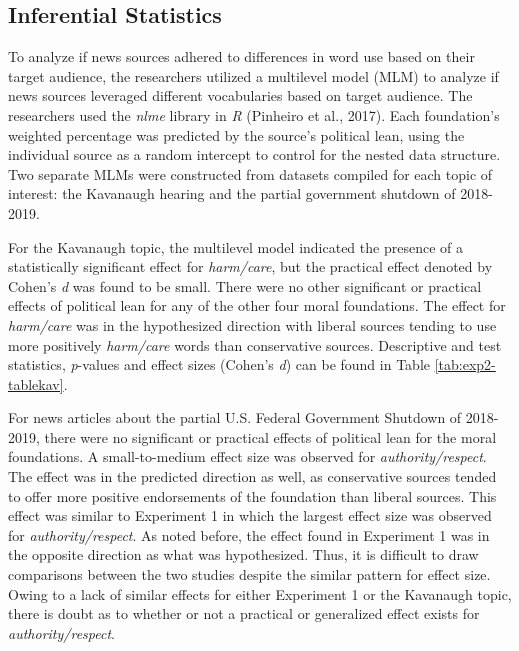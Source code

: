 \documentclass[english,,man]{apa6}
\begin{document}
\hypertarget{inferential-statistics-1}{%
\subsection{Inferential Statistics}\label{inferential-statistics-1}}

To analyze if news sources adhered to differences in word use based on their target audience, the researchers utilized a multilevel model (MLM) to analyze if news sources leveraged different vocabularies based on target audience. The researchers used the \emph{nlme} library in \emph{R} (Pinheiro et al., 2017). Each foundation's weighted percentage was predicted by the source's political lean, using the individual source as a random intercept to control for the nested data structure. Two separate MLMs were constructed from datasets compiled for each topic of interest: the Kavanaugh hearing and the partial government shutdown of 2018-2019.

For the Kavanaugh topic, the multilevel model indicated the presence of a statistically significant effect for \emph{harm/care}, but the practical effect denoted by Cohen's \emph{d} was found to be small. There were no other significant or practical effects of political lean for any of the other four moral foundations. The effect for \emph{harm/care} was in the hypothesized direction with liberal sources tending to use more positively \emph{harm/care} words than conservative sources. Descriptive and test statistics, \emph{p}-values and effect sizes (Cohen's \emph{d}) can be found in Table \ref{tab:exp2-tablekav}.

For news articles about the partial U.S. Federal Government Shutdown of 2018-2019, there were no significant or practical effects of political lean for the moral foundations. A small-to-medium effect size was observed for \emph{authority/respect}. The effect was in the predicted direction as well, as conservative sources tended to offer more positive endorsements of the foundation than liberal sources. This effect was similar to Experiment 1 in which the largest effect size was observed for \emph{authority/respect}. As noted before, the effect found in Experiment 1 was in the opposite direction as what was hypothesized. Thus, it is difficult to draw comparisons between the two studies despite the similar pattern for effect size. Owing to a lack of similar effects for either Experiment 1 or the Kavanaugh topic, there is doubt as to whether or not a practical or generalized effect exists for \emph{authority/respect}.
\end{document}
